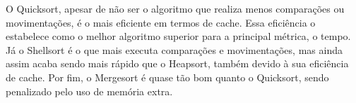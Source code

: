 O Quicksort, apesar de não ser o algoritmo que realiza menos comparações ou movimentações, é o mais eficiente em termos de cache. Essa eficiência o estabelece como o melhor algoritmo superior para a principal métrica, o tempo. Já o Shellsort é o que mais executa comparações e movimentações, mas ainda assim acaba sendo mais rápido que o Heapsort, também devido à sua eficiência de cache. Por fim, o Mergesort é quase tão bom quanto o Quicksort, sendo penalizado pelo uso de memória extra.

